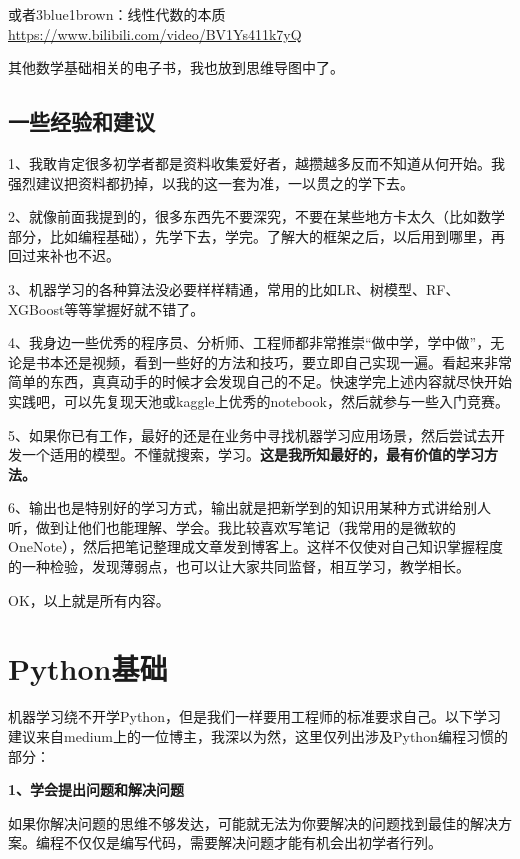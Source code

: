 \documentclass[]{ctexbook}
\begin{document}
或者3blue1brown：线性代数的本质\\
\url{https://www.bilibili.com/video/BV1Ys411k7yQ}

其他数学基础相关的电子书，我也放到思维导图中了。

\hypertarget{ux4e00ux4e9bux7ecfux9a8cux548cux5efaux8bae}{%
\section{一些经验和建议}\label{ux4e00ux4e9bux7ecfux9a8cux548cux5efaux8bae}}

1、我敢肯定很多初学者都是资料收集爱好者，越攒越多反而不知道从何开始。我强烈建议把资料都扔掉，以我的这一套为准，一以贯之的学下去。

2、就像前面我提到的，很多东西先不要深究，不要在某些地方卡太久（比如数学部分，比如编程基础），先学下去，学完。了解大的框架之后，以后用到哪里，再回过来补也不迟。

3、机器学习的各种算法没必要样样精通，常用的比如LR、树模型、RF、XGBoost等等掌握好就不错了。

4、我身边一些优秀的程序员、分析师、工程师都非常推崇``做中学，学中做''，无论是书本还是视频，看到一些好的方法和技巧，要立即自己实现一遍。看起来非常简单的东西，真真动手的时候才会发现自己的不足。快速学完上述内容就尽快开始实践吧，可以先复现天池或kaggle上优秀的notebook，然后就参与一些入门竞赛。

5、如果你已有工作，最好的还是在业务中寻找机器学习应用场景，然后尝试去开发一个适用的模型。不懂就搜索，学习。\textbf{这是我所知最好的，最有价值的学习方法。}

6、输出也是特别好的学习方式，输出就是把新学到的知识用某种方式讲给别人听，做到让他们也能理解、学会。我比较喜欢写笔记（我常用的是微软的OneNote），然后把笔记整理成文章发到博客上。这样不仅使对自己知识掌握程度的一种检验，发现薄弱点，也可以让大家共同监督，相互学习，教学相长。

OK，以上就是所有内容。

\hypertarget{pythonux57faux7840}{%
\chapter{Python基础}\label{pythonux57faux7840}}

机器学习绕不开学Python，但是我们一样要用工程师的标准要求自己。以下学习建议来自medium上的一位博主，我深以为然，这里仅列出涉及Python编程习惯的部分：

\textbf{1、学会提出问题和解决问题}

如果你解决问题的思维不够发达，可能就无法为你要解决的问题找到最佳的解决方案。编程不仅仅是编写代码，需要解决问题才能有机会出初学者行列。
\end{document}

